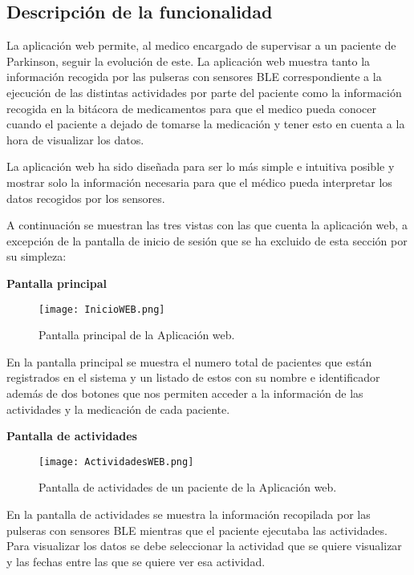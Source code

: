 \documentclass[11pt,spanish]{article}
\begin{document}
\subsection{Descripción de la funcionalidad}
La aplicación web permite, al medico encargado de supervisar a un paciente de Parkinson, seguir la evolución de este. La aplicación web muestra tanto la información recogida por las pulseras con sensores BLE correspondiente a la ejecución de las distintas actividades por parte del paciente como la información recogida en la bitácora de medicamentos para que el medico pueda conocer cuando el paciente a dejado de tomarse la medicación y tener esto en cuenta a la hora de visualizar los datos.
\newline

La aplicación web ha sido diseñada para ser lo más simple e intuitiva posible y mostrar solo la información necesaria para que el médico pueda interpretar los datos recogidos por los sensores.
\newline

A continuación se muestran las tres vistas con las que cuenta la aplicación web, a excepción de la pantalla de inicio de sesión que se ha excluido de esta sección por su simpleza:
\newline

\textbf{Pantalla principal}
\newline

\begin{figure}[H]
  \centering
  \texttt{[image: InicioWEB.png]}
  \caption{Pantalla principal de la Aplicación web.}
\end{figure}

En la pantalla principal se muestra el numero total de pacientes que están registrados en el sistema y un listado de estos con su nombre e identificador además de dos botones que nos permiten acceder a la información de las actividades y la medicación de cada paciente.
\newline
\newline

\textbf{Pantalla de actividades}
\newline

\begin{figure}[H]
  \centering
  \texttt{[image: ActividadesWEB.png]}
  \caption{Pantalla de actividades de un paciente de la Aplicación web.}
\end{figure}

En la pantalla de actividades se muestra la información recopilada por las pulseras con sensores BLE mientras que el paciente ejecutaba las actividades. Para visualizar los datos se debe seleccionar la actividad que se quiere visualizar y las fechas entre las que se quiere ver esa actividad.
\newline
\end{document}
